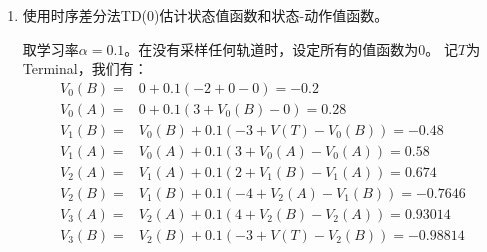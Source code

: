 \documentclass[12pt, a4paper]{article}
\begin{document}
\begin{enumerate}
        对于状态A而言：
        \begin{align*}
        V_0(A) =& 0 + 0.1 (0 - 0) = 0 \\
        V_1(A) =& V_0(A) + 0.1 (1 - V_0(A)) = 0.1 \\
        V_2(A) =& V_1(A) + 0.1 (-1 - V_1(A)) = -0.01 \\
        V_3(A) =& V_2(A) + 0.1 (2 - V_2(A)) = 0.191
        \end{align*}
        对于状态B而言：
        \begin{align*}
        V_0(B) =& 0 + 0.1 (-3 - 0) = -0.3 \\
        V_1(B) =& V_0(B) + 0.1 (-2 - V_0(B)) = -0.47 \\
        V_2(B) =& V_1(B) + 0.1 (-3 - V_1(B)) = -0.723 \\
        V_3(B) =& V_2(B) + 0.1 (-3 - V_2(B)) = -0.9507
        \end{align*}

        我们注意到：在状态A下只执行过动作a，在状态B下只执行过动作b。
        因此$Q(A, a)$、$Q(B, b)$的计算与$V(A)$、$V(B)$完全一致，过程略去。

        综上：
        \begin{align*}
        V(A) =& 0.191 \\
        V(B) =& -0.9507 \\
        Q(A, a) =& 0.191 \\
        Q(B, b) =& -0.9507
        \end{align*}

    \item 使用时序差分法TD(0)估计状态值函数和状态-动作值函数。

        取学习率$\alpha = 0.1$。在没有采样任何轨道时，设定所有的值函数为$0$。
        记$T$为Terminal，我们有：
        \begin{align*}
        V_0(B) =& 0 + 0.1 (-2 + 0 - 0) = -0.2 \tag{Episode 1} \\
        V_0(A) =& 0 + 0.1 (3 + V_0(B) - 0) = 0.28 \tag{Episode 1} \\
        V_1(B) =& V_0(B) + 0.1 (-3 + V(T) - V_0(B)) = -0.48 \tag{Episode 1} \\
        V_1(A) =& V_0(A) + 0.1 (3 + V_0(A) - V_0(A)) = 0.58 \tag{Episode 2} \\
        V_2(A) =& V_1(A) + 0.1 (2 + V_1(B) - V_1(A)) = 0.674 \tag{Episode 2} \\
        V_2(B) =& V_1(B) + 0.1 (-4 + V_2(A) - V_1(B)) = -0.7646 \tag{Episode 2} \\
        V_3(A) =& V_2(A) + 0.1 (4 + V_2(B) - V_2(A)) = 0.93014 \tag{Episode 2} \\
        V_3(B) =& V_2(B) + 0.1 (-3 + V(T) - V_2(B)) = -0.98814 \tag{Episode 2}
        \end{align*}


\end{enumerate}
\end{document}
